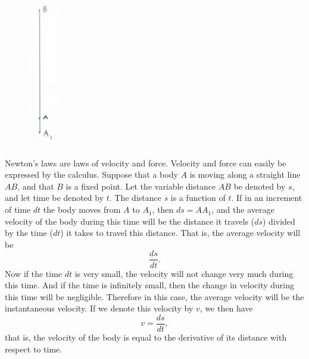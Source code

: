 \documentclass[polutonikogreek,english,twoside,openright]{article}
\begin{document}
\begin{figure}
  \vspace{-45pt}
  \begin{center}
    \includegraphics[width=0.12\textwidth]{fig/Figure80}
  \end{center}
  \vspace{-15pt}
\end{figure}
Newton's laws are laws of velocity and force.  Velocity and force can
easily be expressed by the calculus.  Suppose that a body $A$ is
moving along a straight line $AB$, and that $B$ is a fixed point.  Let
the variable distance $AB$ be denoted by $s$, and let time be denoted
by $t$.  The distance $s$ is a function of $t$.  If in an increment of
time $dt$ the body moves from $A$ to $A_1$, then $ds = AA_1$, and the
average velocity of the body during this time will be the distance it
travels ($ds$) divided by the time ($dt$) it takes to travel this
distance.  That is, the average velocity will be
$$\frac{ds}{dt}.$$
Now if the time $dt$ is very small, the velocity will not change very
much during this time.  And if the time is infinitely small, then the
change in velocity during this time will be negligible.  Therefore in
this case, the average velocity will be the instantaneous velocity.
If we denote this velocity by $v$, we then have
$$v = \frac{ds}{dt},$$
that is, the velocity of the body is equal to the derivative of its
distance with respect to time.
\end{document}
